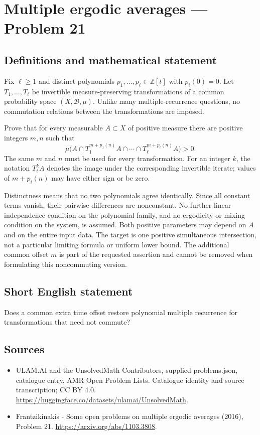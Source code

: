 \documentclass[11pt,a4paper]{article}
\begin{document}
\section*{Multiple ergodic averages — Problem 21}\label{statement}

\subsection{Definitions and mathematical statement}
Fix $\ell\ge1$ and distinct polynomials
$p_1,\ldots,p_\ell\in\mathbb Z[t]$ with $p_i(0)=0$.
Let $T_1,\ldots,T_\ell$ be invertible measure-preserving
transformations of a common probability space
$(X,\mathcal B,\mu)$. Unlike many multiple-recurrence
questions, no commutation relations between the
transformations are imposed.

Prove that for every measurable $A\subset X$ of
positive measure there are positive integers $m,n$
such that
\[
          \mu\bigl(A\cap T_1^{m+p_1(n)}A\cap\cdots
                             \cap T_\ell^{m+p_\ell(n)}A\bigr)>0.
\]
The same $m$ and $n$ must be used for every
transformation. For an integer $k$, the notation
$T_i^kA$ denotes the image under the corresponding
invertible iterate; values of $m+p_i(n)$ may have
either sign or be zero.

Distinctness means that no two polynomials agree
identically. Since all constant terms vanish, their
pairwise differences are nonconstant. No further
linear independence condition on the polynomial
family, and no ergodicity or mixing condition on
the system, is assumed. Both positive parameters
may depend on $A$ and on the entire input data.
The target is one positive simultaneous intersection,
not a particular limiting formula or uniform lower
bound. The additional common offset $m$ is part
of the requested assertion and cannot be removed
when formulating this noncommuting version.
\subsection{Short English statement}
Does a common extra time offset restore polynomial multiple recurrence for transformations that need not commute?
\subsection{Sources}
\begin{itemize}
\item[S1] ULAM.AI and the UnsolvedMath Contributors, supplied problems.json, catalogue entry, AMR Open Problem Lists. Catalogue identity and source transcription; CC BY 4.0.
\url{https://huggingface.co/datasets/ulamai/UnsolvedMath}.
\item[S2] Frantzikinakis - Some open problems on multiple ergodic averages (2016), Problem 21. 
\url{https://arxiv.org/abs/1103.3808}.
\end{itemize}
\end{document}

